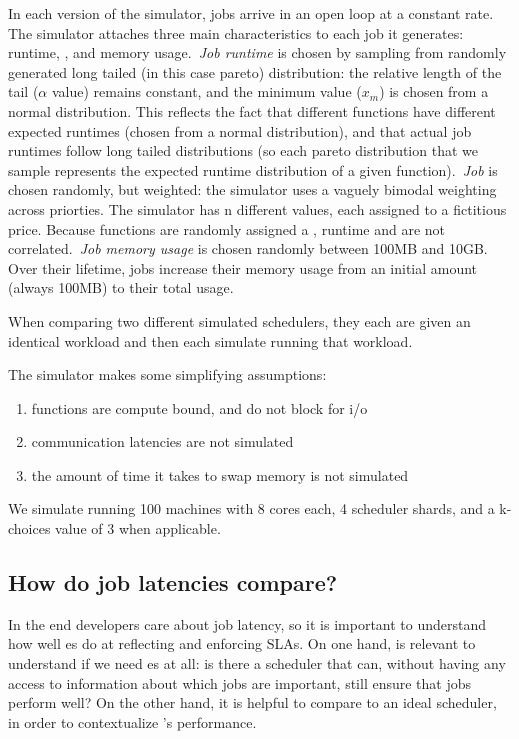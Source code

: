 In each version of the simulator, jobs arrive in an open loop at a constant
rate. The simulator attaches three main characteristics to each job it
generates: runtime, \priceclass{}, and memory usage.\ \textit{Job runtime} is
chosen by sampling from randomly generated long tailed (in this case pareto)
distribution: the relative length of the tail ($\alpha$ value) remains constant,
and the minimum value ($x_m$) is chosen from a normal distribution. This
reflects the fact that different functions have different expected runtimes
(chosen from a normal distribution), and that actual job runtimes follow long
tailed distributions (so each pareto distribution that we sample represents the
expected runtime distribution of a given function).\ \textit{Job \class{}} is
chosen randomly, but weighted: the simulator uses a vaguely bimodal weighting
across priorties. The simulator has n different \priceclass{} values, each
assigned to a fictitious price. Because functions are randomly assigned a
\class{}, runtime and \class{} are not correlated.\ \textit{Job memory usage} is
chosen randomly between 100MB and 10GB. Over their lifetime, jobs increase their
memory usage from an initial amount (always 100MB) to their total usage.

When comparing two different simulated schedulers, they each are given an
identical workload and then each simulate running that workload.

The simulator makes some simplifying assumptions:
\begin{enumerate}
    \item functions are compute bound, and do not block for i/o
    \item communication latencies are not simulated
    \item the amount of time it takes to swap memory is not simulated
\end{enumerate}

We simulate running 100 machines with 8 cores each, 4 scheduler shards, and a
k-choices value of 3 when applicable.

\subsection{How do job latencies compare?}

In the end developers care about job latency, so it is important to understand
how well \priceclass{}es do at reflecting and enforcing SLAs. On one hand, is
relevant to understand if we need \class{}es at all: is there a scheduler that
can, without having any access to information about which jobs are important,
still ensure that jobs perform well? On the other hand, it is helpful to compare
\sys{} to an ideal scheduler, in order to contextualize \sys{}'s performance.

